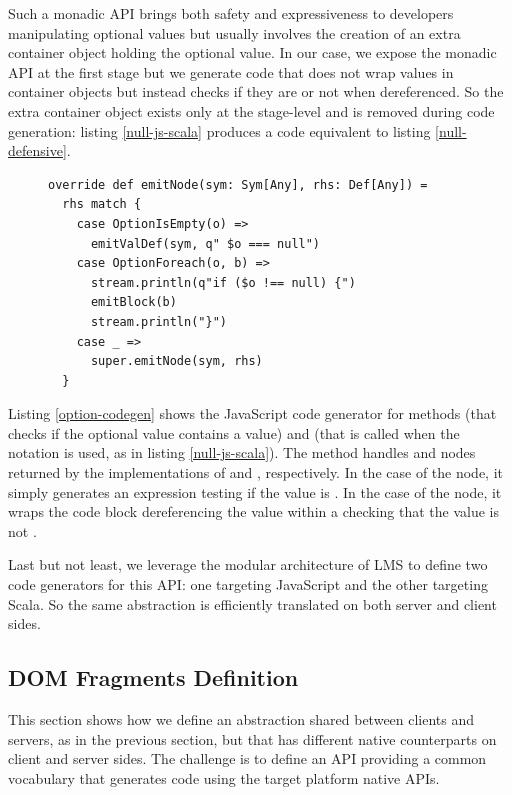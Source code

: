 \documentclass[preprint]{sigplanconf}
\begin{document}
Such a monadic API brings both safety and expressiveness to developers manipulating optional values but usually
involves the creation of an extra container object holding the optional value. In our case, we expose the monadic API
at the first stage but we generate code that does not wrap values in container objects but instead checks if they are
 or not when dereferenced. So the extra container object exists only at the stage-level and is removed
during code generation: listing \ref{null-js-scala} produces a code equivalent to listing \ref{null-defensive}.

\begin{figure}
\begin{lstlisting}[caption=JavaScript code generator for null references handling DSL,label=option-codegen]
override def emitNode(sym: Sym[Any], rhs: Def[Any]) =
  rhs match {
    case OptionIsEmpty(o) =>
      emitValDef(sym, q" $o === null")
    case OptionForeach(o, b) =>
      stream.println(q"if ($o !== null) {")
      emitBlock(b)
      stream.println("}")
    case _ =>
      super.emitNode(sym, rhs)
  }
\end{lstlisting}
\end{figure}

Listing \ref{option-codegen} shows the JavaScript code generator for methods  (that checks if the
optional value contains a value) and  (that is called when the  notation is used, as in
listing \ref{null-js-scala}). The  method handles  and  nodes
returned by the implementations of  and , respectively. In the case of the
 node, it simply generates an expression testing if the value is . In the case of the
 node, it wraps the code block dereferencing the value within a  checking that the value
is not .

Last but not least, we leverage the modular architecture of LMS to define two code generators for this API: one
targeting JavaScript and the other targeting Scala. So the same abstraction is efficiently translated on both server
and client sides.

\subsection{DOM Fragments Definition}

This section shows how we define an abstraction shared between clients and servers, as in the previous section, but
that has different native counterparts on client and server sides. The challenge is to define an API providing a
common vocabulary that generates code using the target platform native APIs.
\end{document}
